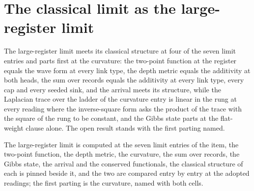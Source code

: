 \section{The classical limit as the large-register limit}\label{mod:I-6-D534793-w-lasc}
\begin{chwall}\label{box:I-6-D534793-w-lasc:1}
The large-register limit meets its classical structure at four of the seven limit entries and parts first at the curvature: the two-point function at the register equals the wave form at every link type, the depth metric equals the additivity at both heads, the sum over records equals the additivity at every link type, every cap and every seeded sink, and the arrival meets its structure, while the Laplacian trace over the ladder of the curvature entry is linear in the rung at every reading where the inverse-square form asks the product of the trace with the square of the rung to be constant, and the Gibbs state parts at the flat-weight clause alone. The open result stands with the first parting named.
\end{chwall}
The large-register limit is computed at the seven limit entries of the item, the two-point function, the depth metric, the curvature, the sum over records, the Gibbs state, the arrival and the conserved functionals, the classical structure of each is pinned beside it, and the two are compared entry by entry at the adopted readings; the first parting is the curvature, named with both cells.

